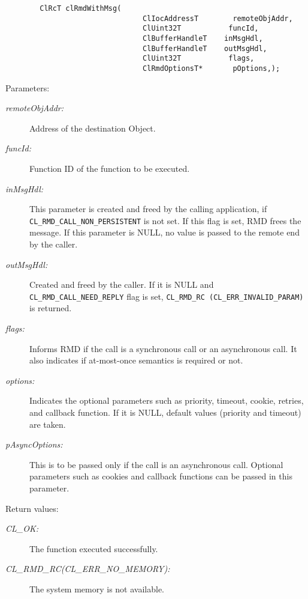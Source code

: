 \begin{flushleft}
\begin{Desc}
\footnotesize\begin{verbatim}        ClRcT clRmdWithMsg(
                                ClIocAddressT        remoteObjAddr,
                                ClUint32T           funcId,
                                ClBufferHandleT    inMsgHdl,
                                ClBufferHandleT    outMsgHdl,
                                ClUint32T           flags,
                                ClRmdOptionsT*       pOptions,);
\end{verbatim}
\normalsize
\end{Desc}
\begin{Desc}
\item[Parameters:]
\begin{description}
\item[{\em remote\-Obj\-Addr:}]Address of the destination Object. 
\item[{\em func\-Id:}]Function ID of the function to be executed. 
\item[{\em in\-Msg\-Hdl:}]This parameter is created and freed by the calling application, if {\tt{CL\_\-RMD\_\-CALL\_\-NON\_\-PERSISTENT}} is not set. If
this flag is set, RMD frees the message. If this parameter is NULL, no value is passed to the remote end by the caller. 
\item[{\em out\-Msg\-Hdl:}]Created and freed by the caller. If it is NULL and {\tt{CL\_\-RMD\_\-CALL\_\-NEED\_\-REPLY}} flag is set, 
{\tt{CL\_\-RMD\_\-RC (CL\_\-ERR\_\-INVALID\_\-PARAM)}} is returned.
\item[{\em flags:}]Informs RMD if the call is a synchronous call or an asynchronous call. It also indicates if at-most-once semantics is required or not. 
\item[{\em options:}]Indicates the optional parameters such as priority, timeout, cookie, retries, and callback function. If it is NULL, default
values (priority and timeout) are taken.
\item[{\em pAsyncOptions:}]This is to be passed only if the call is an asynchronous call. Optional parameters such as cookies and callback 
functions can be passed in this parameter.
 \end{description}
\end{Desc}
\begin{Desc}
\item[Return values:]
\begin{description}
\item[{\em CL\_\-OK:}]The function executed successfully. 
\item[{\em CL\_\-RMD\_\-RC(CL\_\-ERR\_\-NO\_\-MEMORY):}]The system memory is not available.

\end{description}
\end{Desc}
\end{flushleft}
